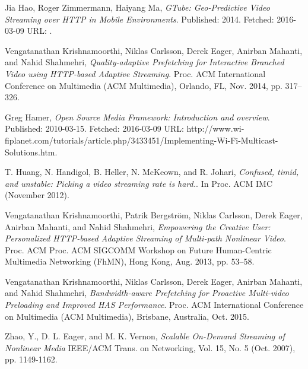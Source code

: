 \documentclass[9pt,a4paper]{acmproc}
\begin{document}
\clearpage
\begin{thebibliography}{9}

  Jia Hao, Roger Zimmermann, Haiyang Ma,
  \emph{GTube: Geo-Predictive Video Streaming over HTTP in Mobile Environments}.
  \newline
  Published: 2014. Fetched: 2016-03-09 
  \newline
	URL: .

  Vengatanathan Krishnamoorthi, Niklas Carlsson, Derek Eager, Anirban 
Mahanti, and Nahid Shahmehri,
  \emph{Quality-adaptive Prefetching for Interactive 
Branched Video using HTTP-based Adaptive Streaming}.
  \newline
  Proc. ACM 
International Conference on Multimedia (ACM Multimedia), Orlando, FL, Nov. 2014, pp. 317--326.

  Greg Hamer,
  \emph{Open Source Media Framework: Introduction and overview}.
  \newline
  Published: 2010-03-15. Fetched: 2016-03-09
 \newline
  URL: http://www.wi-fiplanet.com/tutorials/article.php/3433451/Implementing-Wi-Fi-Multicast-Solutions.htm.
  
  T. Huang, N. Handigol, B. Heller, N. McKeown, and R. Johari,
  \emph{Confused, timid, and unstable: Picking a video streaming rate is hard.}.
  \newline
  In Proc. ACM IMC (November 2012).
  
  Vengatanathan Krishnamoorthi, Patrik Bergström, Niklas Carlsson, Derek 
Eager, Anirban Mahanti, and Nahid Shahmehri,
  \emph{Empowering the Creative User: 
Personalized HTTP-based Adaptive Streaming of Multi-path Nonlinear Video}.
  \newline
  Proc. ACM 
Proc. ACM SIGCOMM Workshop on Future Human-Centric Multimedia Networking 
(FhMN), Hong Kong, Aug. 2013, pp. 53--58.

Vengatanathan Krishnamoorthi, Niklas Carlsson, Derek Eager, Anirban 
Mahanti, and Nahid Shahmehri,
	\emph{Bandwidth-aware Prefetching for Proactive 
Multi-video Preloading and Improved HAS Performance}.
	\newline
	Proc. ACM 
International Conference on Multimedia (ACM Multimedia), Brisbane, 
Australia, Oct. 2015.

Zhao, Y., D. L. Eager, and M. K. Vernon,
	\emph{Scalable On-Demand Streaming of 
Nonlinear Media}
	\newline
	 IEEE/ACM Trans. on Networking, Vol. 15, No. 5 (Oct. 
2007), pp. 1149-1162.


\end{thebibliography}
\end{document}
